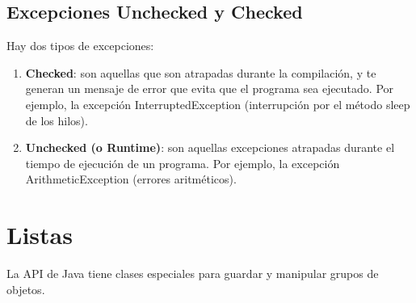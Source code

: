 \subsection{Excepciones Unchecked y Checked}
Hay dos tipos de excepciones:
\begin{enumerate}
    \item \textbf{Checked}: son aquellas que son atrapadas durante la compilación, y te generan un mensaje de error que evita que el programa sea ejecutado. Por ejemplo, la excepción InterruptedException (interrupción por el método sleep de los hilos).
    \item \textbf{Unchecked (o Runtime)}: son aquellas excepciones atrapadas durante el tiempo de ejecución de un programa. Por ejemplo, la excepción ArithmeticException (errores aritméticos).
\end{enumerate}



\section{Listas}
La API de Java tiene clases especiales para guardar y manipular grupos de objetos.

